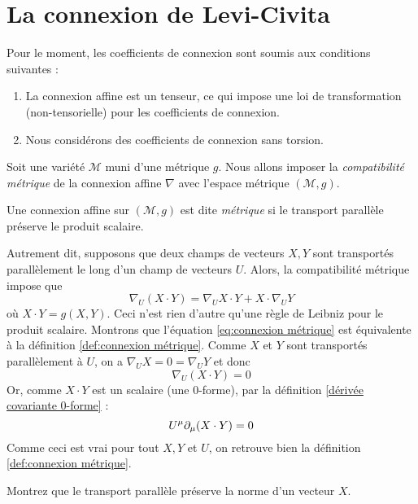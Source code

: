 \section{La connexion de Levi-Civita}
Pour le moment, les coefficients de connexion sont soumis aux conditions suivantes :
\begin{enumerate}
    \item La connexion affine est un tenseur, ce qui impose une loi de transformation (non-tensorielle) pour les coefficients de connexion.
    \item Nous considérons des coefficients de connexion sans torsion.
\end{enumerate}
Soit une variété $\mathcal{M}$ muni d'une métrique $g$. Nous allons imposer la \emph{compatibilité métrique} de la connexion affine $\nabla$ avec l'espace métrique $(\mathcal{M},g)$.
\begin{theoremframe}
    \begin{defi}
        \label{def:connexion métrique}
        Une connexion affine sur $(\mathcal{M},g)$ est dite \emph{métrique} si le transport parallèle préserve le produit scalaire.
    \end{defi}
\end{theoremframe}
Autrement dit, supposons que deux champs de vecteurs $X,Y$ sont transportés parallèlement le long d'un champ de vecteurs $U$. Alors, la compatibilité métrique impose que
\begin{equation}
\label{eq:connexion métrique}
    \nabla_U (X\cdot Y) = \nabla_U X\cdot Y + X\cdot \nabla_U Y
\end{equation}
où $X\cdot Y = g(X,Y)$. Ceci n'est rien d'autre qu'une règle de Leibniz pour le produit scalaire. Montrons que l'équation \ref{eq:connexion métrique} est équivalente à la 
définition \ref{def:connexion métrique}. Comme $X$ et $Y$ sont transportés parallèlement à $U$, on a $\nabla_U X = 0 = \nabla_U Y$ et donc 
\begin{equation}
    \nabla_U (X\cdot Y) = 0
\end{equation}
Or, comme $X\cdot Y$ est un scalaire (une 0-forme), par la définition \ref{dérivée covariante 0-forme} :
\begin{equation}
    U^\mu \partial_\mu (X\cdot Y) = 0
\end{equation}
Comme ceci est vrai pour tout $X,Y$ et $U$, on retrouve bien la définition \ref{def:connexion métrique}.
\begin{exerc}
    Montrez que le transport parallèle préserve la norme d'un vecteur $X$.
\end{exerc}
